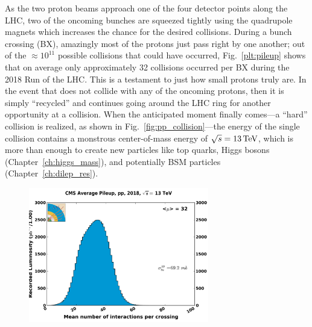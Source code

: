 As the two proton beams approach one of the four detector points along the LHC, two of the oncoming bunches are squeezed tightly using the quadrupole magnets which increases the chance for the desired \pp collisions.
During a bunch crossing (BX), amazingly most of the protons just pass right by one another; 
out of the $\approx$$10^\text{11}$ possible \pp collisions that could have occurred, Fig.~\ref{plt:pileup} shows that on average only approximately 32 collisions occurred per BX during the 2018 Run of the LHC. %
This is a testament to just how small protons truly are.
In the event that \pname does not collide with any of the oncoming protons, then it is simply ``recycled'' and continues going around the LHC ring for another opportunity at a \pp collision.
When the anticipated moment finally comes---\ie a ``hard'' \pp collision is realized, as shown in Fig.~\ref{fig:pp_collision}---the energy of the single collision contains a monstrous center-of-mass energy of $\sqrt{s} = 13\,\text{Te\hspace{-.08em}V}$, which is more than enough to create new particles like top quarks, Higgs bosons (Chapter~\ref{ch:higgs_mass}), and potentially BSM particles (Chapter~\ref{ch:dilep_res}).
\begin{figure}[h]
    \centering
    \includegraphics[width=0.7\textwidth,keepaspectratio]{figures/lhc/pileup_pp_2018.png}

\end{figure}$$

